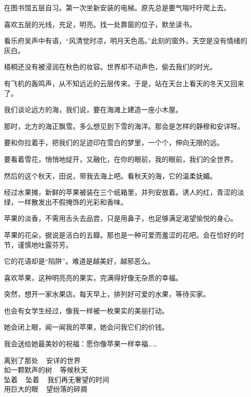 
		在图书馆五层自习。第一次坐新安装的电梯。原先总是要气喘吁吁爬上去。\par
		喜欢五层的光线，充足，明亮。找一处靠窗的位子，默坐读书。\par
		看乐府吴声中有语，“风清觉时凉，明月天色高。”此刻的窗外，天空是没有情绪的灰白。\par
		梧桐还没有被浸润在秋色的妆容。世界却不动声色，偷去我们的时光。\par
		有飞机的轰鸣声，从不知远近的云层传来。于是，站在天台上看天的冬天又回来了。\par
		我们谈论远方的海，我们说，要在海滩上建造一座小木屋。\par
		那时，北方的海正飘雪。多么想见到下雪的海洋。那会是怎样的静穆和安详呀。\par
		要和你拉着手，把我们的足迹印在雪白的梦里，一个个，伸向无限的远。\par
		要看着雪花，悄悄地绽开，又融化，在你的眼前，我的眼前，我们的全世界。\par
		然后的这个秋天，田说，带我去海上吧。看秋天的海，它的温柔妩媚。


		经过水果摊，新鲜的苹果被装在三个纸箱里，并列安放着。诱人的红，青涩的淡绿，一样散发出不假掩饰的光彩和香味。\par
		苹果的淡香，不需用舌头去品尝，只是用鼻子，也足够满足渴望愉悦的身心。\par
		苹果的花朵，据说是洁白的五瓣。那也是一种可爱而羞涩的花吧。会在恰好的时节，谨慎地吐露芬芳。\par
		它的花语却是“陷阱”。难道是越美好，越邪恶么。\par
		喜欢苹果，这种明亮亮的果实，完满得好像无杂质的幸福。\par
		突然，想开一家水果店。每天早上，排列好可爱的水果，等待买家。\par
		也会有女学生经过，像我一样被一枚果实的美丽打动。\par
		她会闭上眼，闻一闻我的苹果，她会问我它们的价钱。\par
		我会送给她最美妙的祝福：愿你像苹果一样幸福……

	\endwriting

	\longpoem{}{}{}

		离别了那处 ~ 安详的世界 \\
		如一颗默声的树 ~ 等候秋天 \\
		坠着 ~ 坠着 ~ 我们再无奢望的时间 \\
		用巨大的眼 ~ 望纷落的碎屑

